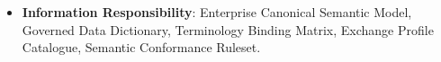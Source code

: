 \begin{itemize}
\begin{itemize}
\begin{itemize}
\item 
\emph{Exposed Service}: \texttt{} — Validates representations for compliance.



\end{itemize}


\end{itemize}


\item 
\textbf{Information Responsibility}: Enterprise Canonical Semantic Model, Governed Data Dictionary, Terminology Binding Matrix, Exchange Profile Catalogue, Semantic Conformance Ruleset.



\end{itemize}
